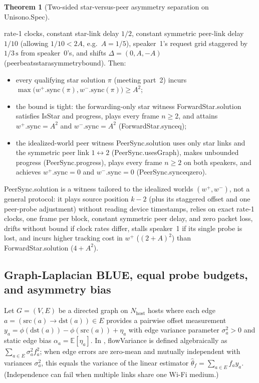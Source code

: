 \documentclass[11pt,a4paper]{article}
\DeclareRobustCommand{\lean}[1]{{\ttfamily\def\_{\textunderscore\allowbreak}#1}}
\newcommand{\E}{\mathbb{E}}
\theoremstyle{definition}
\newtheorem{theorem}[definition]{Theorem}
\begin{document}
\begin{theorem}[Two-sided star-versus-peer asymmetry separation on \lean{Unisono.Spec}]
\begin{enumerate}
  rate-1 clocks, constant star-link delay $1/2$, constant symmetric peer-link
  delay $1/10$ (allowing $1/10 < 2A$, e.g.\ $A = 1/5$), speaker~1's request
  grid staggered by $1/3\,\text{s}$ from speaker~0's, and shifts
  $\Delta = (0, A, -A)$
  (\lean{peer\_beats\_star\_asymmetry\_bound}). Then:
  \begin{itemize}
  \item every qualifying star solution $\pi$ (meeting part~2) incurs
    $\max\bigl(w^+.\mathrm{sync}(\pi), w^-.\mathrm{sync}(\pi)\bigr) \ge A^2$;
  \item the bound is tight: the forwarding-only star witness
    \lean{ForwardStar.solution} satisfies \lean{IsStar} and progress, plays
    every frame $n \ge 2$,
    and attains $w^+.\mathrm{sync} = A^2$ and $w^-.\mathrm{sync} = A^2$
    (\lean{ForwardStar.sync\_eq});
  \item the idealized-world peer witness \lean{PeerSync.solution} uses only
    star links and the symmetric peer link $1 \leftrightarrow 2$
    (\lean{PeerSync.usesGraph}), makes unbounded progress
    (\lean{PeerSync.progress}), plays every frame $n \ge 2$ on both speakers,
    and achieves $w^+.\mathrm{sync} = 0$ and $w^-.\mathrm{sync} = 0$
    (\lean{PeerSync.sync\_eq\_zero}).
  \end{itemize}
\end{enumerate}
\end{theorem}

\lean{PeerSync.solution} is a witness tailored to the idealized worlds
$(w^+, w^-)$, not a general protocol: it plays source position $k - 2$ (plus
its staggered offset and one peer-probe adjustment) without reading device
timestamps, relies on exact rate-1 clocks, one frame per block, constant
symmetric peer delay, and zero packet loss, drifts without bound if clock rates
differ, stalls speaker~1 if its single probe is lost, and incurs higher
tracking cost in $w^+$ ($(2 + A)^2$) than \lean{ForwardStar.solution}
($4 + A^2$).

\subsection{Graph-Laplacian BLUE, equal probe budgets, and asymmetry bias}

Let $G = (V, E)$ be a directed graph on $N_{\mathrm{host}}$ hosts where each
edge $a = (\mathrm{src}(a) \to \mathrm{dst}(a)) \in E$ provides a pairwise
offset measurement $y_a = \phi(\mathrm{dst}(a)) - \phi(\mathrm{src}(a)) + \eta_a$
with edge variance parameter $\sigma_a^2 > 0$ and static edge bias
$\alpha_a = \E[\eta_a]$. In ,
\lean{flowVariance} is defined algebraically as $\sum_{a \in E} \sigma_a^2 f_a^2$;
when edge errors are zero-mean and mutually independent with variances
$\sigma_a^2$, this equals the variance of the linear estimator
$\hat\theta_f = \sum_{a \in E} f_a y_a$. (Independence can fail when multiple
links share one Wi-Fi medium.)
\end{document}
